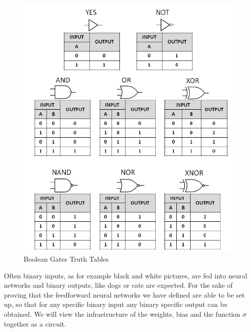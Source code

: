 \documentclass{article}
\theoremstyle{definition}
\newcommand*{\figuretitle}[1]{%
    {\centering%
    \textbf{#1}%
    \par\medskip}%
}
\begin{document}
\begin{figure}
\centering
\includegraphics[scale=0.2]{graphics/Summary-of-the-common-Boolean-logic-gates-with-symbols-and-truth-tables.png}
\caption{Boolean Gates Truth Tables}
\label{fig:bool_gate}
\end{figure}

Often binary inputs, as for example black and white pictures, are fed into neural networks and binary outputs, like dogs or cats are expected. For the sake of proving that the feedforward neural networks we have defined are able to be set up, so that for any specific binary input any binary specific output can be obtained. We will view the infrastructure of the weights, bias and the function $\sigma$ together as a circuit. 
\end{document}
